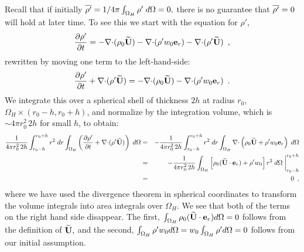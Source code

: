 Recall that if initially $ \overline{{\rho^{\prime}}} = 1 /
{4\pi} \int_{\Omega_H} {\rho^{\prime}} \; d\Omega = 0,$ 
there is no guarantee that $\overline{{\rho^{\prime}}} = 0$ will hold at later
time.  To see this we start with the equation for $\rho'$, 
\begin{equation}
\frac{\partial {\rho^{\prime}}}{\partial t} = - \mathbf{\nabla} \mathbf{\cdot} (\rho_0 \widetilde{{\bf U}})
-\mathbf{\nabla} \mathbf{\cdot} ({\rho^{\prime}} w_0 \mathbf{e}_r) - \mathbf{\nabla} \mathbf{\cdot} ({\rho^{\prime}} \widetilde{{\bf U}} )
\label{eq:rhoprimeold} \enskip ,
\end{equation}
rewritten by moving one term to the left-hand-side:
\begin{equation}
\frac{\partial {\rho^{\prime}}}{\partial t} + \mathbf{\nabla} \mathbf{\cdot} ({\rho^{\prime}} \widetilde{{\bf U}}) 
= - \mathbf{\nabla} \mathbf{\cdot} (\rho_0 \widetilde{{\bf U}})
  -\mathbf{\nabla} \mathbf{\cdot} ({\rho^{\prime}} w_0 \mathbf{e}_r) \enskip .
\end{equation}
We integrate this over a spherical shell of thickness $2h$ at radius $r_0$, 
$\Omega_H \times (r_0-h, r_0+h)$, and normalize by the integration
volume, which is $\sim 4\pi r_0^2 \, 2h$ for small $h$, to obtain:
\begin{eqnarray}
\frac{1}{4\pi r_0^2 \, 2h} \int_{r_0-h}^{r_0+h} r^2 \; dr \int_{\Omega_H} 
    \left(\frac{\partial {\rho^{\prime}}}{\partial t} + \nabla \mathbf{\cdot} ( {\rho^{\prime}} \widetilde{{\bf U}} ) \right) \; d\Omega 
&=& - \frac{1}{4\pi r_0^2 \, 2h} \int_{r_0-h}^{r_0+h} r^2 \; dr 
\int_{\Omega_H} \nabla \mathbf{\cdot} \left( \rho_0 \widetilde{{\bf U}} + {\rho^{\prime}} w_0 \mathbf{e}_r \right) \; d\Omega \nonumber  \\
&=& \left .  - \frac{1}{4\pi r_0^2 \, 2h}  \int_{\Omega_H} 
\left [ \rho_0  (\widetilde{{\bf U}} \cdot \mathbf{e}_r)  + {\rho^{\prime}} w_0 \right] r^2
  \; d\Omega  \; \right  |_{r_0-h}^{r_0+h} \nonumber  \\
&=& 0 \nonumber \enskip ,
\end{eqnarray} 
where we have used the divergence theorem in spherical coordinates to transform
the volume integrals into area integrals over $\Omega_H.$
We see that both of the terms on the right hand side disappear. The first,
$\int_{\Omega_H} \rho_0 (\widetilde{{\bf U}} \cdot \mathbf{e}_r) d\Omega = 0$ follows from the definition of $\widetilde{{\bf U}},$
and the second, $\int_{\Omega_H} {\rho^{\prime}} w_0 d\Omega = w_0 \int_{\Omega_H} {\rho^{\prime}} d\Omega = 0$
follows from our initial assumption.  
